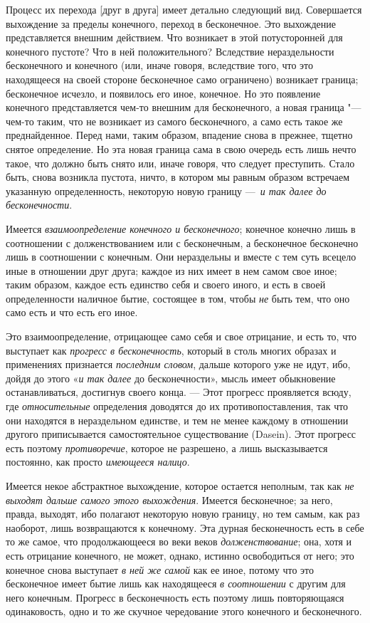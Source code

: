 Процесс их перехода [друг в друга] имеет детально следующий вид. Совершается
выхождение за пределы конечного, переход в бесконечное. Это выхождение
представляется внешним действием. Что возникает в этой потусторонней для
конечного пустоте? Что в ней положительного? Вследствие нераздельности
бесконечного и конечного (или, иначе говоря, вследствие того, что это
находящееся на своей стороне бесконечное само ограничено) возникает
граница; бесконечное исчезло, и появилось его иное, конечное. Но это
появление конечного представляется чем-то внешним для бесконечного, а
новая граница "--- чем-то таким, что не возникает из самого бесконечного, а
само есть такое же преднайденное. Перед нами, таким образом, впадение снова
в прежнее, тщетно снятое определение. Но эта новая граница сама в свою
очередь есть лишь нечто такое, что должно быть снято или, иначе говоря, что
следует преступить. Стало быть, снова возникла пустота, ничто, в котором мы
равным образом встречаем указанную определенность, некоторую новую границу
—~{\em и так далее до бесконечности}.

Имеется {\em взаимоопределение конечного и
бесконечного}; конечное конечно лишь в соотношении с долженствованием или с
бесконечным, а бесконечное бесконечно лишь в соотношении с конечным. Они
нераздельны и вместе с тем суть всецело иные в отношении друг
друга; каждое из них имеет в нем самом свое иное; таким образом, каждое
есть единство себя и своего иного, и есть в своей определенности наличное
бытие, состоящее в том, чтобы {\em не} быть тем, что
оно само есть и что есть его иное.

Это взаимоопределение, отрицающее само себя и свое отрицание, и есть то, что
выступает как {\em прогресс в бесконечность}, который в
столь многих образах и применениях признается
{\em последним словом}, дальше которого уже не идут,
ибо, дойдя до этого «{\em и так далее} до
бесконечности», мысль имеет обыкновение останавливаться, достигнув своего
конца. — Этот прогресс проявляется всюду, где
{\em относительные} определения доводятся до их
противопоставления, так что они находятся в нераздельном единстве, и тем не
менее каждому в отношении другого приписывается самостоятельное
существование (Dasein). Этот прогресс есть поэтому
{\em противоречие}, которое не разрешено, а лишь
высказывается постоянно, как просто {\em имеющееся
налицо}.

Имеется некое абстрактное выхождение, которое остается неполным, так как
{\em не выходят дальше самого этого выхождения}.
Имеется бесконечное; за него, правда, выходят, ибо полагают некоторую новую
границу, но тем самым, как раз наоборот, лишь возвращаются к конечному. Эта
дурная бесконечность есть в себе то же самое, что продолжающееся во веки
веков {\em долженствование}; она, хотя и есть отрицание
конечного, не может, однако, истинно освободиться от него; это конечное
снова выступает {\em в ней же самой} как ее иное,
потому что это бесконечное имеет бытие лишь как находящееся
{\em в соотношении} с другим для него конечным.
Прогресс в бесконечность есть поэтому лишь повторяющаяся одинаковость, одно
и то же скучное чередование этого конечного и бесконечного.

